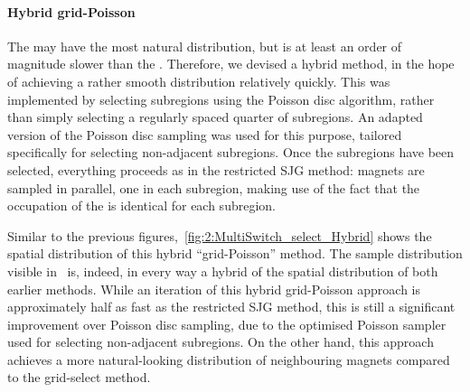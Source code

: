 \paragraph{Hybrid grid-Poisson}
The  may have the most natural distribution, but is at least an order of magnitude slower than the .
Therefore, we devised a hybrid method, in the hope of achieving a rather smooth distribution relatively quickly.
This was implemented by selecting subregions using the Poisson disc algorithm, rather than simply selecting a regularly spaced quarter of subregions.
An adapted version of the Poisson disc sampling was used for this purpose, tailored specifically for selecting non-adjacent subregions.
Once the subregions have been selected, everything proceeds as in the restricted SJG method: magnets are sampled in parallel, one in each subregion, making use of the fact that the occupation of the  is identical for each subregion. \\\par
Similar to the previous figures,~\cref{fig:2:MultiSwitch_select_Hybrid} shows the spatial distribution of this hybrid ``grid-Poisson'' method.
The sample distribution visible in~ is, indeed, in every way a hybrid of the spatial distribution of both earlier methods.
While an iteration of this hybrid grid-Poisson approach is approximately half as fast as the restricted SJG method, this is still a significant improvement over Poisson disc sampling, due to the optimised Poisson sampler used for selecting non-adjacent subregions.
On the other hand, this approach achieves a more natural-looking distribution of neighbouring magnets compared to the grid-select method. \par


